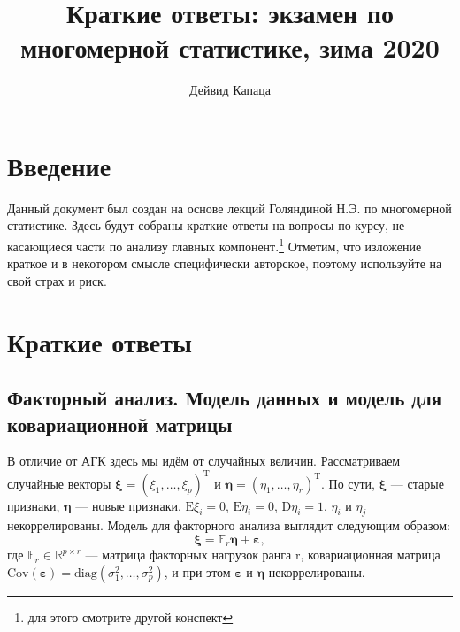 \documentclass[12pt,a4paper,final]{article}
\author{Дейвид Капаца}
\title{Краткие ответы: экзамен по многомерной статистике, зима 2020}
\newcommand{\1}{\mathds{1}}
\begin{document}
\maketitle
\tableofcontents

\newpage
\section{Введение}

Данный документ был создан на основе лекций Голяндиной Н.Э. по многомерной статистике. Здесь будут собраны краткие ответы на вопросы по курсу, не касающиеся части по анализу главных компонент.\footnote{для этого смотрите другой конспект} Отметим, что изложение краткое и в некотором смысле специфически авторское, поэтому используйте на свой страх и риск.


\section{Краткие ответы}


\subsection{Факторный анализ. Модель данных и модель для ковариационной матрицы}

В отличие от АГК здесь мы идём от случайных величин. Рассматриваем случайные векторы $\bm \xi = (\xi_1,\ldots,\xi_p)^\mathrm{T}$ и $\bm \eta = (\eta_1,\ldots,\eta_r)^\mathrm{T}$. По сути, $\bm \xi$ --- старые признаки, $\bm \eta$ --- новые признаки. $ \mathrm{E} \xi_i = 0,\, \mathrm{E} \eta_i = 0,\,  \mathrm{D} \eta_i = 1$,  $\eta_i$ и $\eta_j$ некоррелированы. Модель для факторного анализа выглядит следующим образом:
$$
\bm \xi = \mathbb{F}_r \bm \eta + \bm \varepsilon,
$$
где $\mathbb{F}_r \in \mathbb{R}^{p \times r}$ --- матрица факторных нагрузок ранга r, ковариационная матрица $\mathrm{Cov}(\bm \varepsilon) = \mathrm{diag} (\sigma^2_1,\ldots, \sigma_p^2)$, и при этом $\bm \varepsilon$ и $\bm \eta$ некоррелированы.
\end{document}
